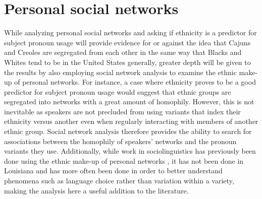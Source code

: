 \documentclass{article}\usepackage[]{graphicx}\usepackage[]{xcolor}
\begin{document}

  \section{Personal social networks}
    \label{sec:personal_networks}
    While analyzing personal social networks and asking if ethnicity is a predictor for subject pronoun usage will provide evidence for or against the idea that Cajuns and Creoles are segregated from each other in the same way that Blacks and Whites tend to be in the United States generally, greater depth will be given to the results by also employing social network analysis to examine the ethnic make-up of personal networks.
    For instance, a case where ethnicity proves to be a good predictor for subject pronoun usage would suggest that ethnic groups are segregated into networks with a great amount of homophily.
    However, this is not inevitable as speakers are not precluded from using variants that index their ethnicity versus another even when regularly interacting with members of another ethnic group.
    Social network analysis therefore provides the ability to search for associations between the homophily of speakers' networks and the pronoun variants they use.
    Additionally, while work in sociolinguistics has previously been done using the ethnic make-up of personal networks \parencite{holliday_intonational_2016, li_two-step_2000, sharma_scalar_2017, zhang_co-ethnic_2012}, it has not been done in Louisiana and has more often been done in order to better understand phenomena such as language choice rather than variation within a variety, making the analysis here a useful addition to the literature.
\end{document}
